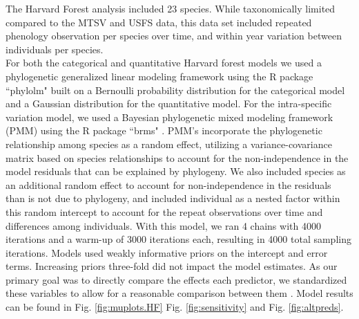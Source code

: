 \documentclass[11pt]{article}
\begin{document}
\noindent The Harvard Forest analysis included 23 species. While taxonomically limited compared to the MTSV and USFS data, this data set included repeated phenology observation per species over time, and within year variation between individuals per species. \\ 

\noindent For both the categorical and quantitative Harvard forest models we used a phylogenetic generalized linear modeling framework \citep{Ives2010} using the R package ``phylolm" \citep{Ho2014} built on a Bernoulli probability distribution for the categorical model and a Gaussian distribution for the quantitative model. For the intra-specific variation model, we used a Bayesian phylogenetic mixed modeling framework (PMM) \citep{Garamszegi2014} using the R package ``brms" \citep{Burkner2018}. PMM's incorporate the phylogenetic relationship among species as a random effect, utilizing a variance-covariance matrix based on species relationships to account for the non-independence in the model residuals that can be explained by phylogeny. We also included species as an additional random effect to account for non-independence in the residuals than is not due to phylogeny, and included individual as a nested factor within this random intercept to account for the repeat observations over time and differences among individuals. With this model, we ran 4 chains with 4000 iterations and a warm-up of 3000 iterations each, resulting in 4000 total sampling iterations. Models used weakly informative priors on the intercept and error terms. Increasing priors three-fold did not impact the model estimates. As our primary goal was to directly compare the effects each predictor, we standardized these variables to allow for a reasonable comparison between them {\citep{Gelman2007}. Model results can be found in Fig. \ref{fig:muplots.HF} Fig. \ref{fig:sensitivity} and Fig. \ref{fig:altpreds}.\\

}
\end{document}
